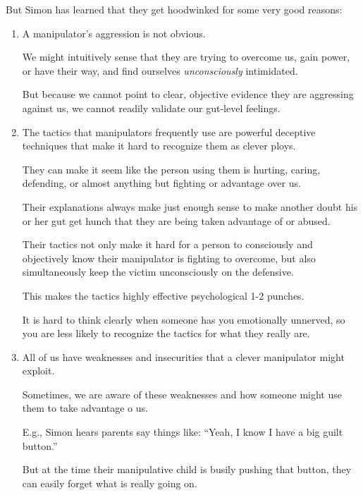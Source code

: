 \documentclass[oneside]{book}
\numberwithin{equation}{section}
\begin{document}
But Simon has learned that they get hoodwinked for some very good reasons:
\begin{enumerate}
    \item A manipulator's aggression is not obvious.
    
    We might intuitively sense that they are trying to overcome us, gain power, or have their way, and find ourselves \textit{unconsciously} intimidated.
    
    But because we cannot point to clear, objective evidence they are aggressing against us, we cannot readily validate our gut-level feelings.
    \item The tactics that manipulators frequently use are powerful deceptive techniques that make it hard to recognize them as clever ploys.
    
    They can make it seem like the person using them is hurting, caring, defending, or almost anything but fighting or advantage over us.
    
    Their explanations always make just enough sense to make another doubt his or her gut get hunch that they are being taken advantage of or abused.
    
    Their tactics not only make it hard for a person to consciously and objectively know their manipulator is fighting to overcome, but also simultaneously keep the victim unconsciously on the defensive.
    
    This makes the tactics highly effective psychological 1-2 punches.
    
    It is hard to think clearly when someone has you emotionally unnerved, so you are less likely to recognize the tactics for what they really are.
    \item All of us have weaknesses and insecurities that a clever manipulator might exploit.
    
    Sometimes, we are aware of these weaknesses and how someone might use them to take advantage o us.
    
    E.g., Simon hears parents say things like: ``Yeah, I know I have a big guilt button.''
    
    But at the time their manipulative child is busily pushing that button, they can easily forget what is really going on.
    
    
    

\end{enumerate}
\end{document}
